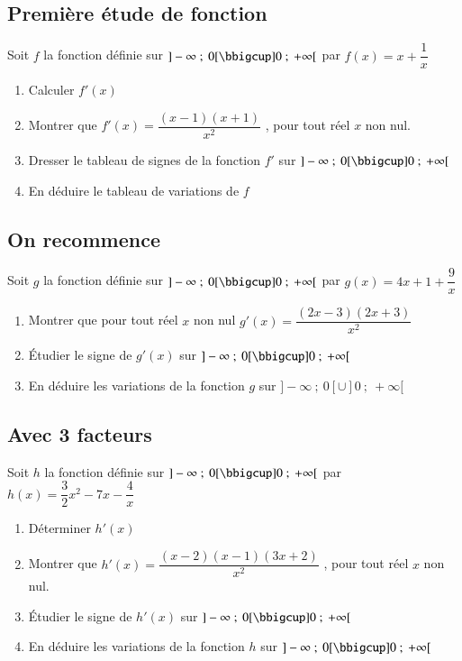 \documentclass[oneside,12pt]{article}          %
\begin{document}
\subsection{Première étude de fonction}
Soit $f$ la fonction définie sur $]-\infty ~;~ 0[\bbigcup]0 ~;~ +\infty[$ par $f(x) = x + \dfrac{1}{x}$
\begin{enumerate}
	\item Calculer $f'(x)$
	\item Montrer que $f'(x)=\dfrac{(x-1)(x+1)}{x^2}$ , \quad pour tout réel $x$ non nul.
	\item Dresser le tableau de signes de la fonction $f'$ sur $]-\infty ~;~ 0[\bbigcup]0 ~;~ +\infty[$ 
	\item En déduire le tableau de variations de $f$
\end{enumerate}



\subsection{On recommence}
Soit $g$ la fonction définie sur $]-\infty ~;~ 0[\bbigcup]0 ~;~ +\infty[$ par $g(x) = 4x + 1 + \dfrac{9}{x}$
\begin{enumerate}
\item Montrer que pour tout réel $x$ non nul $g'(x) = \dfrac{(2x - 3)(2x + 3)}{x^2}$
\item Étudier le signe de $g'(x)$ sur $]-\infty ~;~ 0[\bbigcup]0 ~;~ +\infty[$
\item En déduire les variations de la fonction $g$ sur $]-\infty ~;~ 0[\cup]0 ~;~ +\infty[$
\end{enumerate}



\subsection{Avec 3 facteurs}
Soit $h$ la fonction définie sur $]-\infty ~;~ 0[\bbigcup]0 ~;~ +\infty[$ par $h(x) = \dfrac{3}{2}x^2 - 7x - \dfrac{4}{x}$
\begin{enumerate}
\item Déterminer $h'(x)$
\item Montrer que $h'(x)=\dfrac{(x-2)(x-1)(3x+2)}{x^2}$ , \quad pour tout réel $x$ non nul.
\item Étudier le signe de $h'(x)$ sur $]-\infty ~;~ 0[\bbigcup]0 ~;~ +\infty[$
\item En déduire les variations de la fonction $h$ sur $]-\infty ~;~ 0[\bbigcup]0 ~;~ +\infty[$
\end{enumerate}
\end{document}
